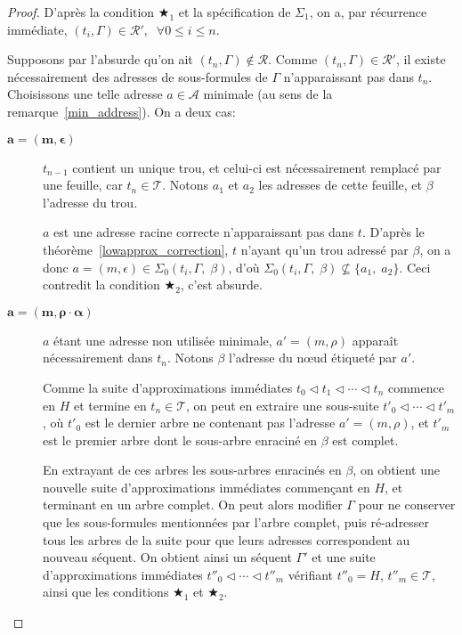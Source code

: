 \documentclass[11pt,a4paper]{article}
\theoremstyle{plain}
\theoremstyle{definition}
\theoremstyle{remark}
\newcommand*{\someadd}{\rho}
\newcommand*{\sequent}{\Gamma}
\newcommand*{\addresses}{\ensuremath{\mathcal{A}}}
\newcommand*{\trees}{\ensuremath{\mathcal{T}}}
\newcommand*{\representations}{\ensuremath{\mathcal{R}}}
\newcommand*{\representationspartial}{\ensuremath{\mathcal{R'}}}
\newcommand*{\relapprox}{\ensuremath{\triangleleft}}
\newcommand*{\lowapprox}{\ensuremath{\Sigma_0}}
\newcommand*{\highapprox}{\ensuremath{\Sigma_1}}
\newcommand*{\exactcond}{\bigstar_1}
\newcommand*{\exactcondbis}{\bigstar_2}
\begin{document}
\begin{proof}
    D'après la condition $\exactcond$ et la spécification de $\highapprox$, on a, par récurrence immédiate, $(t_i, \sequent) \in \representationspartial, \; \; \forall 0 \leq i \leq n$.

    Supposons par l'absurde qu'on ait $(t_n, \sequent) \notin \representations$. Comme $(t_n, \sequent) \in \representationspartial$, il existe nécessairement des adresses de sous-formules de $\sequent$ n'apparaissant pas dans $t_n$. Choisissons une telle adresse $a \in \addresses$ minimale (au sens de la remarque~\ref{min_address}). On a deux cas:

    \begin{description}
        \item[$\bm{a = (m, \epsilon)}$] $t_{n-1}$ contient un unique trou, et celui-ci est nécessairement remplacé par une feuille, car $t_n \in \trees$. Notons $a_1$ et $a_2$ les adresses de cette feuille, et $\beta$ l'adresse du trou.
        
        $a$ est une adresse racine correcte n'apparaissant pas dans $t$. D'après le théorème~\ref{lowapprox_correction}, $t$ n'ayant qu'un trou adressé par $\beta$, on a donc $a = (m, \epsilon) \in \lowapprox(t_i, \sequent, \; \beta)$, d'où $\lowapprox(t_i, \sequent, \; \beta) \nsubseteq \{a_1, \; a_2\}$.
        Ceci contredit la condition $\exactcondbis$, c'est absurde.

        \item[$\bm{a = (m, \someadd \cdot \alpha)}$] $a$ étant une adresse non utilisée minimale, $a' = (m, \someadd)$ apparaît nécessairement dans $t_n$. Notons $\beta$ l'adresse du n\oe ud étiqueté par $a'$.

        Comme la suite d'approximations immédiates $t_0 \relapprox t_1 \relapprox \cdots \relapprox t_n$ commence en $H$ et termine en $t_n \in \trees$, on peut en extraire une sous-suite $t'_0 \relapprox \cdots \relapprox t'_m$, où $t'_0$ est le dernier arbre ne contenant pas l'adresse $a' = (m, \someadd)$, et $t'_m$ est le premier arbre dont le sous-arbre enraciné en $\beta$ est complet.

        En extrayant de ces arbres les sous-arbres enracinés en $\beta$, on obtient une nouvelle suite d'approximations immédiates commençant en $H$, et terminant en un arbre complet. On peut alors modifier $\sequent$ pour ne conserver que les sous-formules mentionnées par l'arbre complet, puis ré-adresser tous les arbres de la suite pour que leurs adresses correspondent au nouveau séquent. On obtient ainsi un séquent $\sequent'$ et une suite d'approximations immédiates $t''_0 \relapprox \cdots \relapprox t''_m$ vérifiant $t''_0 = H$, $t''_m \in \trees$, ainsi que les conditions $\exactcond$ et $\exactcondbis$.


\end{description}
\end{proof}
\end{document}
